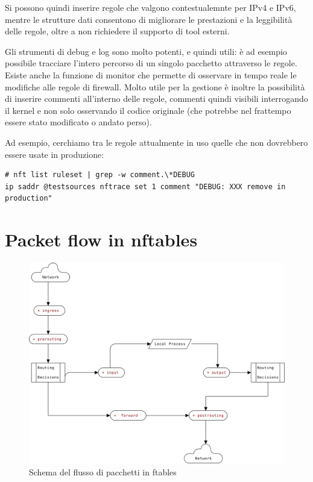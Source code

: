 Si possono quindi inserire regole che valgono contestualemnte per IPv4 e IPv6,
mentre le strutture dati consentono di migliorare le prestazioni e la
leggibilit\`a delle regole, oltre a non richiedere il supporto di tool
esterni.

Gli strumenti di debug e log sono molto potenti, e quindi utili: \`e ad
esempio possibile tracciare l'intero percorso di un singolo pacchetto
attraverso le regole.  Esiste anche la funzione di monitor che permette di
osservare in tempo reale le modifiche alle regole di firewall.
Molto utile per la gestione è inoltre la possibilità di inserire commenti
all'interno delle regole, commenti quindi visibili interrogando il kernel e non
solo osservando il codice originale (che potrebbe nel frattempo essere stato 
modificato o andato perso).

Ad esempio, cerchiamo tra le regole attualmente in uso quelle che non
dovrebbero essere usate in produzione:
\begin{lstlisting}
# nft list ruleset | grep -w comment.\*DEBUG
ip saddr @testsources nftrace set 1 comment "DEBUG: XXX remove in production"
\end{lstlisting}

\section{Packet flow in nftables}

\begin{figure}[H]
    \centering
    \includegraphics[width=\linewidth]{flow.svg.png}
    \caption{Schema del flusso di pacchetti in ftables}
    \label{fig:flow}
\end{figure}

